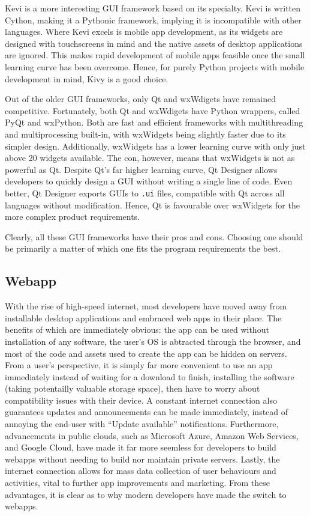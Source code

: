 \documentclass[11pt]{article}
\begin{document}
Kevi is a more interesting GUI framework based on its specialty. Kevi is written Cython, making it a Pythonic framework, implying it is incompatible with other languages. Where Kevi excels is mobile app development, as its widgets are designed with touchscreens in mind and the native assets of desktop applications are ignored. This makes rapid development of mobile apps feasible once the small learning curve has been overcome. Hence, for purely Python projects with mobile development in mind, Kivy is a good choice.

Out of the older GUI frameworks, only Qt and wxWdigets have remained competitive. Fortunately, both Qt and wxWdigets have Python wrappers, called PyQt and wxPython. Both are fast and efficient frameworks with multithreading and multiprocessing built-in, with wxWidgets being slightly faster due to its simpler design. Additionally, wxWidgets has a lower learning curve with only just above 20 widgets available. The con, however, means that wxWidgets is not as powerful as Qt. Despite Qt's far higher learning curve, Qt Designer allows developers to quickly design a GUI without writing a single line of code. Even better, Qt Designer exports GUIs to \texttt{.ui} files, compatible with Qt across all languages without modification. Hence, Qt is favourable over wxWidgets for the more complex product requirements.

Clearly, all these GUI frameworks have their pros and cons. Choosing one should be primarily a matter of which one fits the program requirements the best.

\subsection{Webapp}

With the rise of high-speed internet, most developers have moved away from installable desktop applications and embraced web apps in their place. The benefits of which are immediately obvious: the app can be used without installation of any software, the user's OS is abtracted through the browser, and most of the code and assets used to create the app can be hidden on servers. From a user's perspective, it is simply far more convenient to use an app immediately instead of waiting for a download to finish, installing the software (taking potentailly valuable storage space), then have to worry about compatibility issues with their device. A constant internet connection also guarantees updates and announcements can be made immediately, instead of annoying the end-user with ``Update available'' notifications. Furthermore, advancements in public clouds, such as Microsoft Azure, Amazon Web Services, and Google Cloud, have made it far more seemless for developers to build webapps without needing to build nor maintain private servers. Lastly, the internet connection allows for mass data collection of user behaviours and activities, vital to further app improvements and marketing. From these advantages, it is clear as to why modern developers have made the switch to webapps.
\end{document}
